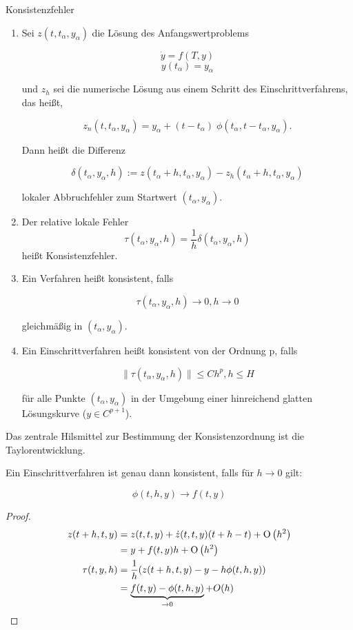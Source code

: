 \begin{definition}[Definition IV.4] Konsistenzfehler
	\begin{enumerate}
		\item
			Sei $z(t, t_\alpha, y_\alpha)$ die Lösung des Anfangswertproblems 
		
			$$\dot{y} = f(T,y)$$
			$$y(t_\alpha) = y_\alpha$$
		
			und $z_h$ sei die numerische Lösung aus einem Schritt des Einschrittverfahrens, das heißt, 
			
			$$z_n(t, t_\alpha, y_\alpha) = y_\alpha + (t - t_\alpha) \; \phi(t_\alpha, t-t_\alpha, y_\alpha).$$
			
			Dann heißt die Differenz 
			
			$$\delta(t_\alpha, y_\alpha, h) := z(t_\alpha + h, t_\alpha, y_\alpha) - z_h(t_\alpha + h, t_\alpha, y_\alpha)$$
			
			lokaler Abbruchfehler zum Startwert $(t_\alpha, y_\alpha)$.
		\item
			Der relative lokale Fehler
			$$\tau(t_\alpha, y_\alpha, h) = \frac{1}{h}\delta(t_\alpha, y_\alpha, h)$$
			heißt Konsistenzfehler.
			
		\item
			Ein Verfahren heißt konsistent, falls 
			
			$$\tau(t_\alpha, y_\alpha, h) \to 0, h \to 0$$
			
			gleichmäßig in $(t_\alpha, y_\alpha)$.
			
		\item
			Ein Einschrittverfahren heißt konsistent von der Ordnung p, falls 
			
			$$\|\tau(t_\alpha, y_\alpha, h)\| \le C h^p, h \le H$$ 
			
			für alle Punkte $(t_\alpha, y_\alpha)$ in der Umgebung einer hinreichend glatten Lösungskurve ($y \in C^{p+1}$).
	\end{enumerate}
\end{definition}

Das zentrale Hilsmittel zur Bestimmung der Konsistenzordnung ist die Taylorentwicklung.

\begin{lemma}
	Ein Einschrittverfahren ist genau dann konsistent, falls für $h \to 0$ gilt:
	
	$$\phi(t,h,y) \to f(t,y)$$
\end{lemma}	

\begin{proof}
	\begin{align*}
		z(t+h, t, y) &= z(t,t,y) + \dot{z}(t,t,y)(t+h-t) + \operatorname{O}\left(h^2\right) \\
		&= y + f(t,y) h + \operatorname{O}\left(h^2\right) \\
		\tau(t,y,h) &= \frac{1}{h} (z(t+h, t, y) - y - h \phi (t,h,y)) \\
		 &= \underbrace{f(t,y) - \phi(t,h,y)}_{\to 0} + O(h) 
	\end{align*}
\end{proof}

